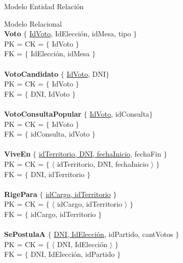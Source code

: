 \begin{section}{Modelo Entidad Relaci\'on}
\begin{subsection}{Modelo Relacional}
\\
\textbf{Voto} $ \lbrace $ \underline{IdVoto}, IdElecci\'on, idMesa, tipo $ \rbrace $ \\
PK = CK = $ \lbrace $ IdVoto $ \rbrace $ \\
FK = $ \lbrace $ IdElecci\'on, idMesa $ \rbrace $\\
\\
\textbf{VotoCandidato} $ \lbrace $ \underline{IdVoto}, DNI$ \rbrace $ \\
PK = CK = $ \lbrace $  IdVoto $ \rbrace $ \\
FK = $ \lbrace $ DNI, IdVoto $ \rbrace $\\
\\
\textbf{VotoConsultaPopular} $ \lbrace $ \underline{IdVoto}, idConsulta$ \rbrace $ \\
PK = CK = $ \lbrace $  IdVoto $ \rbrace $ \\
FK = $ \lbrace $ idConsulta, idVoto $ \rbrace $\\
\\
\textbf{ViveEn} $ \lbrace $ \underline{idTerritorio, DNI, fechaInicio}, fechaFin $ \rbrace $ \\
PK = CK = $ \lbrace $ $ \langle $ idTerritorio, DNI, fechaInicio $ \rangle $ $ \rbrace $ \\
FK = $ \lbrace $ DNI, idTerritorio $ \rbrace $\\
\\
\textbf{RigePara} $ \lbrace $ \underline{idCargo, idTerritorio} $ \rbrace $ \\
PK = CK = $ \lbrace $ $ \langle $ idCargo, idTerritorio $ \rangle $ $ \rbrace $ \\
FK = $ \lbrace $ idCargo, idTerritorio $ \rbrace $\\
\\
\textbf{SePostulaA} $ \lbrace $ \underline{DNI, IdElecci\'on}, idPartido, cantVotos $ \rbrace $ \\
PK = CK = $ \lbrace $ $ \langle $ DNI, IdElecci\'on $ \rangle $ $ \rbrace $ \\
FK = $ \lbrace $ DNI, IdElecci\'on, idPartido $ \rbrace $\\


\end{subsection}

\end{section}
